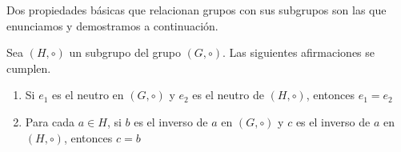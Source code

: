 
Dos propiedades básicas que relacionan grupos con sus subgrupos son las que enunciamos y demostramos a continuación.

\begin{proposition}
Sea $(H, \circ)$ un subgrupo del grupo $(G, \circ)$. Las siguientes afirmaciones se cumplen.
	\begin{enumerate}
		\item Si $e_1$ es el neutro en $(G, \circ)$ y $e_2$ es el neutro de $(H, \circ)$, entonces $e_1 = e_2$

		\item Para cada $a \in H$, si $b$ es el inverso de $a$ en $(G, \circ)$ y $c$ es el inverso de $a$ en $(H, \circ)$, entonces $c = b$
	\end{enumerate}
\end{proposition}




